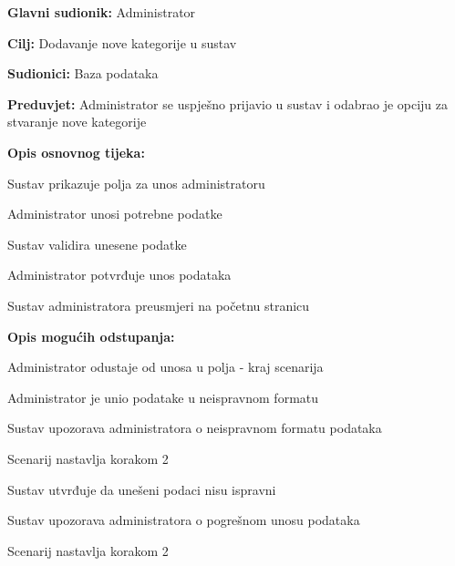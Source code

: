 					\noindent {}
					\begin{packed_item}
	
						\item \textbf{Glavni sudionik: }Administrator
						\item  \textbf{Cilj:} Dodavanje nove kategorije u sustav
						\item  \textbf{Sudionici:} Baza podataka
						\item  \textbf{Preduvjet:} Administrator se uspješno prijavio u sustav i odabrao je opciju za stvaranje nove kategorije
						\item  \textbf{Opis osnovnog tijeka:}
						
						\item[] \begin{packed_enum}
							\item Sustav prikazuje polja za unos administratoru
							\item Administrator unosi potrebne podatke
							\item Sustav validira unesene podatke
							\item Administrator potvrđuje unos podataka
							\item Sustav administratora preusmjeri na početnu stranicu
						\end{packed_enum}

						\item  \textbf{Opis mogućih odstupanja:}

						\item[] \begin{packed_item}
							\item[2.a] Administrator odustaje od unosa u polja - kraj scenarija
							\item[3.a] Administrator je unio podatake u neispravnom formatu
							\item[] \begin{packed_enum}
								\item Sustav upozorava administratora o neispravnom formatu podataka
								\item Scenarij nastavlja korakom 2 
							\end{packed_enum}	
							\item[5.a] Sustav utvrđuje da unešeni podaci nisu ispravni
							\item[] \begin{packed_enum}
								\item Sustav upozorava administratora o pogrešnom unosu podataka
								\item Scenarij nastavlja korakom 2 
							\end{packed_enum}					
						\end{packed_item}
					\end{packed_item}

